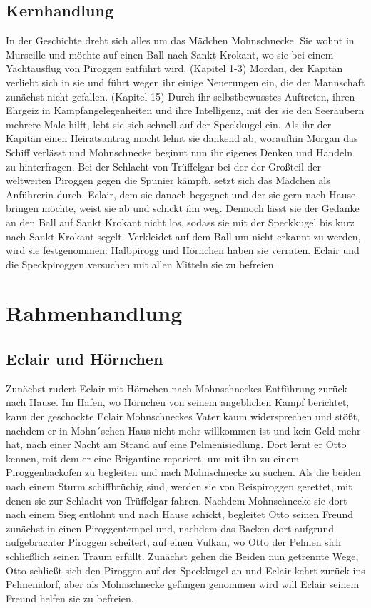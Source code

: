 \subsection{Kernhandlung}
In der Geschichte dreht sich alles um das Mädchen Mohnschnecke. Sie wohnt in Murseille und möchte auf einen Ball nach Sankt Krokant, wo sie bei einem Yachtausflug von Piroggen entführt wird. (Kapitel 1-3) Mordan, der Kapitän verliebt sich in sie und führt wegen ihr einige Neuerungen ein, die der Mannschaft zunächst nicht gefallen. (Kapitel 15) Durch ihr selbstbewusstes Auftreten, ihren Ehrgeiz in Kampfangelegenheiten und ihre Intelligenz, mit der sie den Seeräubern mehrere Male hilft, lebt sie sich schnell auf der Speckkugel ein. Als ihr der Kapitän einen Heiratsantrag macht lehnt sie dankend ab, woraufhin Morgan das Schiff verlässt und Mohnschnecke beginnt nun ihr eigenes Denken und Handeln zu hinterfragen. Bei der Schlacht von Trüffelgar bei der der Großteil der weltweiten Piroggen gegen die Spunier kämpft, setzt sich das Mädchen als Anführerin durch. Eclair, dem sie danach begegnet und der sie gern nach Hause bringen möchte, weist sie ab und schickt ihn weg. Dennoch lässt sie der Gedanke an den Ball auf Sankt Krokant nicht los, sodass sie mit der Speckkugel bis kurz nach Sankt Krokant segelt. Verkleidet auf dem Ball um nicht erkannt zu werden, wird sie festgenommen: Halbpirogg und Hörnchen haben sie verraten. Eclair und die Speckpiroggen versuchen mit allen Mitteln sie zu befreien.

\section{Rahmenhandlung}

\subsection{Eclair und Hörnchen}

Zunächst rudert Eclair mit Hörnchen nach Mohnschneckes Entführung zurück nach Hause. Im Hafen, wo Hörnchen von seinem angeblichen Kampf berichtet, kann der geschockte Eclair Mohnschneckes Vater kaum widersprechen und stößt, nachdem er in Mohn´schen Haus nicht mehr willkommen ist und kein Geld mehr hat, nach einer Nacht am Strand auf eine Pelmenisiedlung. Dort lernt er Otto kennen, mit dem er eine Brigantine repariert, um mit ihn zu einem Piroggenbackofen zu begleiten und nach Mohnschnecke zu suchen. Als die beiden nach einem Sturm schiffbrüchig sind, werden sie von Reispiroggen gerettet, mit denen sie zur Schlacht von Trüffelgar fahren. Nachdem Mohnschnecke sie dort nach einem Sieg entlohnt und nach Hause schickt, begleitet Otto seinen Freund zunächst in einen Piroggentempel und, nachdem das Backen dort aufgrund aufgebrachter Piroggen scheitert, auf einen Vulkan, wo Otto der Pelmen sich schließlich seinen Traum erfüllt. Zunächst gehen die Beiden nun getrennte Wege, Otto schließt sich den Piroggen auf der Speckkugel an und Eclair kehrt zurück ins Pelmenidorf, aber als Mohnschnecke gefangen genommen wird will Eclair seinem Freund helfen sie zu befreien.

